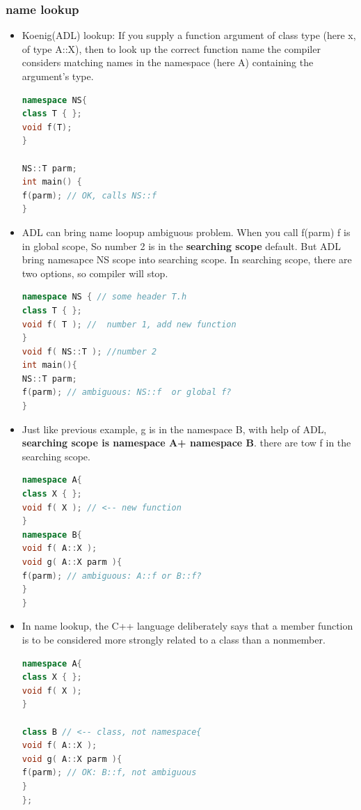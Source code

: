 \documentclass[a4paper,12pt,twoside]{book}
\begin{document}
\subsubsection{name lookup}
\begin{itemize}

\item Koenig(ADL) lookup: If you supply a function argument of class type (here x, of type A::X), then to look up the correct function name the compiler considers matching names in the namespace (here A) containing the argument's type.
\begin{lstlisting}[frame=single, language=c++]
namespace NS{
class T { };
void f(T);
}

NS::T parm;
int main() {
f(parm); // OK, calls NS::f
}
\end{lstlisting}


\item ADL can bring name loopup ambiguous problem.  When you call f(parm) f is in global scope, So number 2 is in the \textbf{searching scope} default. But ADL bring namesapce NS scope into searching scope. In searching scope, there are two options, so compiler will stop.
\begin{lstlisting}[frame=single, language=c++]
namespace NS { // some header T.h
class T { };
void f( T ); //  number 1, add new function
}
void f( NS::T ); //number 2
int main(){
NS::T parm;
f(parm); // ambiguous: NS::f  or global f?
}
\end{lstlisting}

\item Just like previous example, g is in the namespace B, with help of ADL, \textbf{searching scope is namespace A+ namespace B}. there are tow f in the searching scope.

\begin{lstlisting}[frame=single, language=c++]
namespace A{
class X { };
void f( X ); // <-- new function
}
namespace B{
void f( A::X );
void g( A::X parm ){
f(parm); // ambiguous: A::f or B::f?
}
}
\end{lstlisting}

\item In name lookup, the C++ language deliberately says that a member function is to be considered more strongly related to a class than a nonmember.
\begin{lstlisting}[frame=single, language=c++]
namespace A{
class X { };
void f( X );
}

class B // <-- class, not namespace{
void f( A::X );
void g( A::X parm ){
f(parm); // OK: B::f, not ambiguous
}
};
\end{lstlisting}


\end{itemize}
\end{document}
